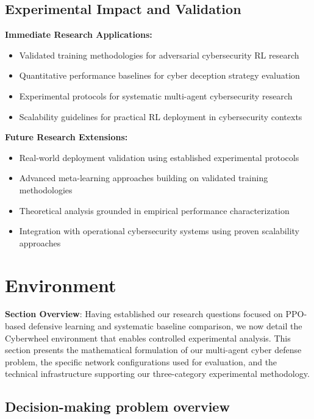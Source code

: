 \documentclass[12pt,oneside,a4paper]{article}
\theoremstyle{definition}
\theoremstyle{plain}
\begin{document}
\subsection{Experimental Impact and Validation}

\textbf{Immediate Research Applications:}
\begin{itemize}
\item Validated training methodologies for adversarial cybersecurity RL research
\item Quantitative performance baselines for cyber deception strategy evaluation  
\item Experimental protocols for systematic multi-agent cybersecurity research
\item Scalability guidelines for practical RL deployment in cybersecurity contexts
\end{itemize}

\textbf{Future Research Extensions:}
\begin{itemize}
\item Real-world deployment validation using established experimental protocols
\item Advanced meta-learning approaches building on validated training methodologies
\item Theoretical analysis grounded in empirical performance characterization
\item Integration with operational cybersecurity systems using proven scalability approaches
\end{itemize}

\section{Environment}

\textbf{Section Overview}: Having established our research questions focused on PPO-based defensive learning and systematic baseline comparison, we now detail the Cyberwheel environment that enables controlled experimental analysis. This section presents the mathematical formulation of our multi-agent cyber defense problem, the specific network configurations used for evaluation, and the technical infrastructure supporting our three-category experimental methodology.

\subsection{Decision-making problem overview}
\end{document}
